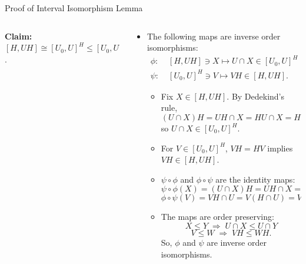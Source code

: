 \begin{frame}[fragile,label=ProofOfIntervalIsomorphism,shrink=5]{Proof of Interval Isomorphism Lemma}
  \begin{columns}
    \begin{column}{0.4\textwidth}
      {\bf Claim:} $[H, UH]  \cong  [U_0, U]^H \leq [U_0, U]$.

\vskip5mm

      \begin{center}
      \end{center}
    \end{column}
    \begin{column}{0.7\textwidth}
      \begin{itemize}
      \item<1-> 
        The following maps are inverse order isomorphisms:
        \begin{align*}
          \phi: \;& [H, UH] \ni X \mapsto U\cap X \in [U_0, U]^H\\[6pt]
          \psi: \;& [U_0, U]^H \ni V \mapsto VH \in [H, UH].
        \end{align*}
        \begin{itemize}
        \item<2-> Fix $X\in [H, UH]$.  By Dedekind's rule,
          \[
          (U\cap X) H = UH \cap X= HU \cap X = H(U \cap X),
          \]
          so $U\cap X \in [U_0, U]^H$.\\[6pt]
        \item<3->For $V\in [U_0, U]^H$, $VH = HV$ implies $VH \in [H, UH]$. \\[6pt]
        \item<4->  $\psi \circ \phi$ and 
          $\phi \circ \psi$ are the identity maps:
          \[
          \psi \circ \phi (X) = (U\cap X)H =UH \cap X = X,
          \]
          \[
          \phi \circ \psi(V)= VH \cap U =V(H\cap U)= V.
          \]
        \item<5->The maps are order preserving:
          \[X\leq Y \; \Rightarrow \; U\cap X \leq U\cap Y\]
          \[V\leq W \; \Rightarrow \; VH \leq WH.\]
          So, $\phi$ and $\psi$ are inverse order isomorphisms.
        \end{itemize}


\end{itemize}
\end{column}
\end{columns}
\end{frame}
